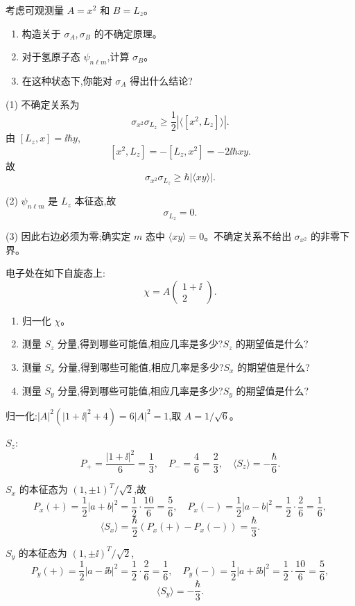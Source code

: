 \begin{question}
考虑可观测量 $A=x^2$ 和 $B=L_z$。
\begin{enumerate}
\item 构造关于 $\sigma_A,\sigma_B$ 的不确定原理。
\item 对于氢原子态 $\psi_{n\ell m}$,计算 $\sigma_B$。
\item 在这种状态下,你能对 $\sigma_A$ 得出什么结论?
\end{enumerate}
\end{question}
\begin{solution}

(1) 不确定关系为
\[
\sigma_{x^2}\sigma_{L_z}\ge\frac12|\langle[x^2,L_z]\rangle|.
\]
由 $[L_z,x]=\ii\hbar y$,
\[
[x^2,L_z]=-[L_z,x^2]=-2\ii\hbar xy.
\]
故
\[
\sigma_{x^2}\sigma_{L_z}\ge \hbar|\langle xy\rangle|.
\]

(2) $\psi_{n\ell m}$ 是 $L_z$ 本征态,故
\[
\sigma_{L_z}=0.
\]

(3) 因此右边必须为零;确实定 $m$ 态中 $\langle xy\rangle=0$。不确定关系不给出 $\sigma_{x^2}$ 的非零下界。

\end{solution}

\begin{question}
电子处在如下自旋态上:
\[
\chi=A\begin{pmatrix}1+\ii\\2\end{pmatrix}.
\]
\begin{enumerate}
\item 归一化 $\chi$。
\item 测量 $S_z$ 分量,得到哪些可能值,相应几率是多少?$S_z$ 的期望值是什么?
\item 测量 $S_x$ 分量,得到哪些可能值,相应几率是多少?$S_x$ 的期望值是什么?
\item 测量 $S_y$ 分量,得到哪些可能值,相应几率是多少?$S_y$ 的期望值是什么?
\end{enumerate}
\end{question}
\begin{solution}

归一化:$|A|^2(|1+
\ii|^2+4)=6|A|^2=1$,取 $A=1/\sqrt6$。

$S_z$:
\[
P_+=\frac{|1+\ii|^2}{6}=\frac13,
\quad P_-=\frac{4}{6}=\frac23,
\quad \langle S_z\rangle=-\frac\hbar6.
\]

$S_x$ 的本征态为 $(1,\pm1)^T/\sqrt2$,故
\[
P_x(+)=\frac12|a+b|^2=\frac12\cdot\frac{10}{6}=\frac56,
\quad P_x(-)=\frac12|a-b|^2=\frac12\cdot\frac{2}{6}=\frac16,
\]
\[
\langle S_x\rangle=\frac\hbar2(P_x(+)-P_x(-))=\frac\hbar3.
\]

$S_y$ 的本征态为 $(1,\pm\ii)^T/\sqrt2$,
\[
P_y(+)=\frac12|a-\ii b|^2=\frac12\cdot\frac{2}{6}=\frac16,
\quad P_y(-)=\frac12|a+\ii b|^2=\frac12\cdot\frac{10}{6}=\frac56,
\]
\[
\langle S_y\rangle=-\frac\hbar3.
\]

\end{solution}

